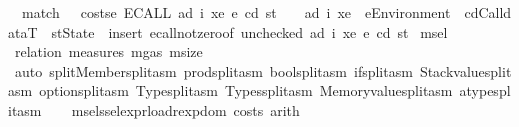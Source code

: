 \begin{isabellebody}
\ \ match\ \ \ {\isachardoublequoteopen}costs\isactrlsub e\ {\isacharparenleft}{\kern0pt}ECALL\ ad\ i\ xe{\isacharparenright}{\kern0pt}\ e\ cd\ st\ {\isacharless}{\kern0pt}\ {\isacharunderscore}{\kern0pt}{\isachardoublequoteclose}\ \ ad\ i\ xe\ \ e{\isacharcolon}{\kern0pt}{\isacharcolon}{\kern0pt}Environment\ \ cd{\isacharcolon}{\kern0pt}{\isacharcolon}{\kern0pt}CalldataT\ \ st{\isacharcolon}{\kern0pt}{\isacharcolon}{\kern0pt}State\ {\isasymRightarrow}\ {\isacartoucheopen}insert\ ecall{\isacharunderscore}{\kern0pt}not{\isacharunderscore}{\kern0pt}zero{\isacharbrackleft}{\kern0pt}of\ {\isacharparenleft}{\kern0pt}unchecked{\isacharparenright}{\kern0pt}\ ad\ i\ xe\ e\ cd\ st{\isacharbrackright}{\kern0pt}{\isacartoucheclose}\isanewline
\isanewline
{}\isamarkupfalse%
\ msel\isanewline
%
\isadelimproof
\ \ %
\endisadelimproof
%
\isatagproof
{}\isamarkupfalse%
\ {\isacharparenleft}{\kern0pt}relation\ {\isachardoublequoteopen}measures\ {\isacharbrackleft}{\kern0pt}mgas{\isacharcomma}{\kern0pt}\ msize{\isacharbrackright}{\kern0pt}{\isachardoublequoteclose}{\isacharparenright}{\kern0pt}\isanewline
\ \ \isamarkupfalse%
\ {\isacharparenleft}{\kern0pt}auto\ split{\isacharcolon}{\kern0pt}Member{\isachardot}{\kern0pt}split{\isacharunderscore}{\kern0pt}asm\ prod{\isachardot}{\kern0pt}split{\isacharunderscore}{\kern0pt}asm\ bool{\isachardot}{\kern0pt}split{\isacharunderscore}{\kern0pt}asm\ if{\isacharunderscore}{\kern0pt}split{\isacharunderscore}{\kern0pt}asm\ Stackvalue{\isachardot}{\kern0pt}split{\isacharunderscore}{\kern0pt}asm\ option{\isachardot}{\kern0pt}split{\isacharunderscore}{\kern0pt}asm\ Type{\isachardot}{\kern0pt}split{\isacharunderscore}{\kern0pt}asm\ Types{\isachardot}{\kern0pt}split{\isacharunderscore}{\kern0pt}asm\ Memoryvalue{\isachardot}{\kern0pt}split{\isacharunderscore}{\kern0pt}asm\ atype{\isachardot}{\kern0pt}split{\isacharunderscore}{\kern0pt}asm{\isacharparenright}{\kern0pt}\isanewline
\ \ \isamarkupfalse%
\ {\isacharparenleft}{\kern0pt}msel{\isacharunderscore}{\kern0pt}ssel{\isacharunderscore}{\kern0pt}expr{\isacharunderscore}{\kern0pt}load{\isacharunderscore}{\kern0pt}rexp{\isacharunderscore}{\kern0pt}dom{\isacharplus}{\kern0pt}{\isacharcomma}{\kern0pt}\ costs{\isacharquery}{\kern0pt}{\isacharcomma}{\kern0pt}\ arith{\isacharparenright}{\kern0pt}{\isacharplus}{\kern0pt}\isanewline
\ \ \isamarkupfalse%
%
\endisatagproof
{\isafoldproof}%
%
\isadelimproof
%
\endisadelimproof

\end{isabellebody}
